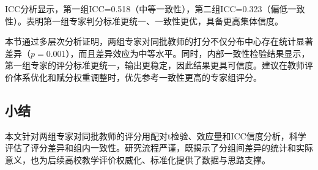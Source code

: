 ICC分析显示，第一组ICC=0.518（中等一致性），第二组ICC=0.323（偏低一致性）。表明第一组专家判分标准更统一、一致性更优，具备更高集体信度。

本节通过多层次分析证明，两组专家对同批教师的打分不仅分布中心存在统计显著差异（$p=0.001$），而且差异效应为中等水平。同时，内部一致性检验结果显示，第一组专家的评分标准更统一，输出更稳定，因此结果更具可信度。建议在教师评价体系优化和赋分权重调整时，优先参考一致性更高的专家组评分。





\subsection{小结}
本文针对两组专家对同批教师的评分用配对t检验、效应量和ICC信度分析，科学评估了评分差异和组内一致性。研究流程严谨，既揭示了分组间差异的统计和实际意义，也为后续高校教学评价权威化、标准化提供了数据与思路支撑。





